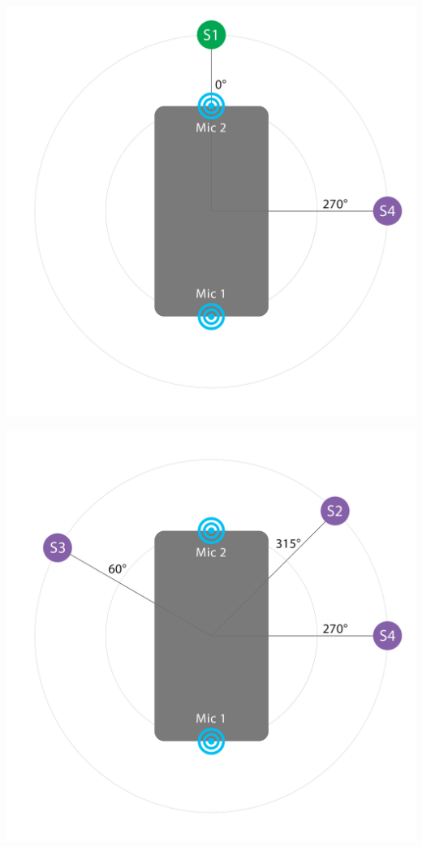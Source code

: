 \begin{minipage}{\linewidth}
\begin{multicols}{2}
\begin{Figure}
    \label{fig:2mix2}
\end{Figure}
\begin{Figure}
    \centering
    \includegraphics[width=0.99\linewidth]{fig/2mix3.png}
    \label{fig:3mix1}
\end{Figure}
\begin{Figure}
    \centering
    \includegraphics[width=0.99\linewidth]{fig/3mix1.png}
    \label{fig:3mix2}
\end{Figure}
\end{multicols}
\end{minipage}
\vfill






\newpage
